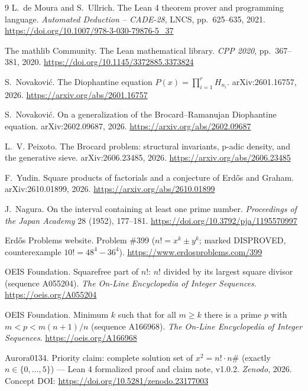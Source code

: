 \documentclass[11pt]{article}
\theoremstyle{definition}
\begin{document}
\begin{thebibliography}{9}
L.~de Moura and S.~Ullrich.
\newblock The Lean 4 theorem prover and programming language.
\newblock \emph{Automated Deduction -- CADE-28}, LNCS, pp.~625--635, 2021.
\url{https://doi.org/10.1007/978-3-030-79876-5_37}

The mathlib Community.
\newblock The Lean mathematical library.
\newblock \emph{CPP 2020}, pp.~367--381, 2020.
\url{https://doi.org/10.1145/3372885.3373824}

S.~Novakovi\'c.
\newblock The Diophantine equation $P(x) = \prod_{i=1}^{r} H_{n_i}$.
\newblock arXiv:2601.16757, 2026. \url{https://arxiv.org/abs/2601.16757}

S.~Novakovi\'c.
\newblock On a generalization of the Brocard--Ramanujan Diophantine equation.
\newblock arXiv:2602.09687, 2026. \url{https://arxiv.org/abs/2602.09687}

L.~V. Peixoto.
\newblock The Brocard problem: structural invariants, p-adic density, and the
generative sieve.
\newblock arXiv:2606.23485, 2026. \url{https://arxiv.org/abs/2606.23485}

F.~Yudin.
\newblock Square products of factorials and a conjecture of Erd\H{o}s and
Graham.
\newblock arXiv:2610.01899, 2026. \url{https://arxiv.org/abs/2610.01899}

J.~Nagura.
\newblock On the interval containing at least one prime number.
\newblock \emph{Proceedings of the Japan Academy} 28 (1952), 177--181.
\url{https://doi.org/10.3792/pja/1195570997}

Erd\H{o}s Problems website.
\newblock Problem \#399 ($n! = x^k \pm y^k$; marked DISPROVED, counterexample
$10! = 48^4 - 36^4$).
\newblock \url{https://www.erdosproblems.com/399}

OEIS Foundation.
\newblock Squarefree part of $n!$: $n!$ divided by its largest square divisor
(sequence A055204).
\newblock \emph{The On-Line Encyclopedia of Integer Sequences}.
\url{https://oeis.org/A055204}

OEIS Foundation.
\newblock Minimum $k$ such that for all $m \ge k$ there is a prime $p$ with
$m < p < m(n+1)/n$ (sequence A166968).
\newblock \emph{The On-Line Encyclopedia of Integer Sequences}.
\url{https://oeis.org/A166968}

Aurora0134.
\newblock Priority claim: complete solution set of $x^2 = n! \cdot n\#$
(exactly $n \in \{0,\ldots,5\}$) --- Lean 4 formalized proof and claim note,
v1.0.2.
\newblock \emph{Zenodo}, 2026. Concept DOI:
\url{https://doi.org/10.5281/zenodo.23177003}
\end{thebibliography}
\end{document}
